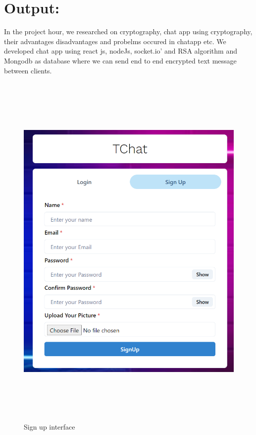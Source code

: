 \section{ Output:}
In the project hour, we researched on cryptography, chat app using cryptography, their advantages
disadvantages and probelms occured in chatapp etc. We developed chat app using react js, nodeJs, socket.io’
and RSA algorithm and Mongodb as database where we can send end to end encrypted text message between clients.

\begin{figure}[H]
	\centering
	\includegraphics[width=160mm, height=180mm]{images/signup.png}
	\caption{Sign up interface} %
	\label{figusecase} %
\end{figure}

